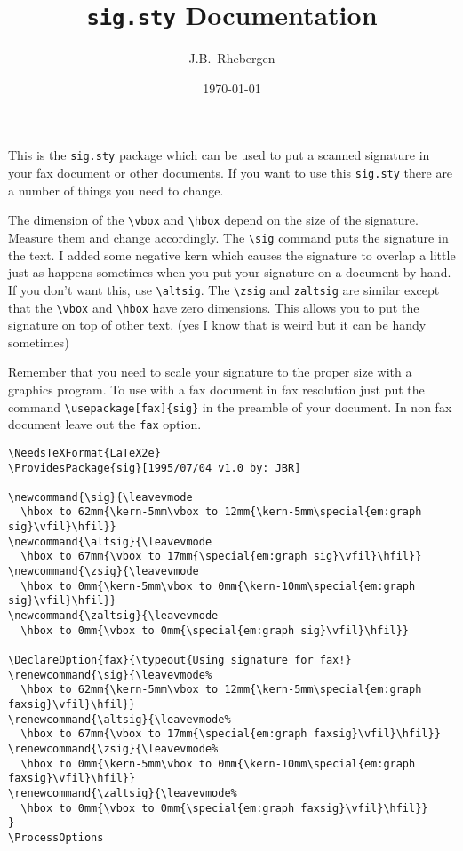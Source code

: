 \documentclass[oldtoc,a4paper,10pt]{artikel3}
\begin{document}
\author{J.B.~Rhebergen}
\date{\today}
\title{{\tt sig.sty} Documentation}
\maketitle

This is the {\tt sig.sty} package which can be used to put a scanned
signature in your fax document or other documents. If you want to use this
{\tt sig.sty} there are a number of things you need to change.

The dimension of the \verb|\vbox| and \verb|\hbox| depend on the size of
the signature. Measure them and change accordingly. The \verb|\sig| command
puts the signature in the text. I added some negative kern which causes the
signature to overlap a little just as happens sometimes when you put your
signature on a document by hand. If you don't want this, use
\verb|\altsig|. The \verb|\zsig| and \verb|zaltsig| are similar except that
the \verb|\vbox| and \verb|\hbox| have zero dimensions. This allows you to
put the signature on top of other text. (yes I know that is weird but it
can be handy sometimes)

Remember that you need to scale your signature to the proper size with
a graphics program. To use with a fax document in fax resolution just put
the command \verb|\usepackage[fax]{sig}| in the preamble of your document.
In non fax document leave out the {\tt fax} option.

\footnotesize
\begin{verbatim}
\NeedsTeXFormat{LaTeX2e}
\ProvidesPackage{sig}[1995/07/04 v1.0 by: JBR]

\newcommand{\sig}{\leavevmode
  \hbox to 62mm{\kern-5mm\vbox to 12mm{\kern-5mm\special{em:graph sig}\vfil}\hfil}}
\newcommand{\altsig}{\leavevmode
  \hbox to 67mm{\vbox to 17mm{\special{em:graph sig}\vfil}\hfil}}
\newcommand{\zsig}{\leavevmode
  \hbox to 0mm{\kern-5mm\vbox to 0mm{\kern-10mm\special{em:graph sig}\vfil}\hfil}}
\newcommand{\zaltsig}{\leavevmode
  \hbox to 0mm{\vbox to 0mm{\special{em:graph sig}\vfil}\hfil}}
                   
\DeclareOption{fax}{\typeout{Using signature for fax!}
\renewcommand{\sig}{\leavevmode%
  \hbox to 62mm{\kern-5mm\vbox to 12mm{\kern-5mm\special{em:graph faxsig}\vfil}\hfil}}
\renewcommand{\altsig}{\leavevmode%
  \hbox to 67mm{\vbox to 17mm{\special{em:graph faxsig}\vfil}\hfil}}
\renewcommand{\zsig}{\leavevmode%
  \hbox to 0mm{\kern-5mm\vbox to 0mm{\kern-10mm\special{em:graph faxsig}\vfil}\hfil}}
\renewcommand{\zaltsig}{\leavevmode%
  \hbox to 0mm{\vbox to 0mm{\special{em:graph faxsig}\vfil}\hfil}}
}
\ProcessOptions
\end{verbatim}
\normalsize
\end{document}
